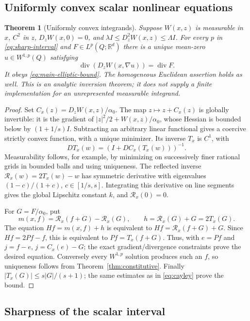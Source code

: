 \documentclass[11pt,a4paper]{article}
\numberwithin{equation}{section}
\newtheorem{theorem}{Theorem}[section]
\theoremstyle{definition}
\theoremstyle{remark}\newtheorem{remark}[theorem]{Remark}
\DeclareMathOperator{\diver}{div}
\newcommand{\R}{\mathbb R}
\newcommand{\Id}{I}
\begin{document}
\subsection{Uniformly convex scalar nonlinear equations}

\begin{theorem}[Uniformly convex integrands]\label{thm:nonlinear}
Suppose \(W(x,z)\) is measurable in \(x\), \(C^2\) in \(z\),
\(D_zW(x,0)=0\), and
\(\lambda\Id\leq D_z^2W(x,z)\leq\Lambda\Id\).
For every \(p\) in \eqref{eq:sharp-interval} and \(F\in L^p(Q;\R^d)\)
there is a unique mean-zero \(u\in W^{1,p}(Q)\) satisfying
\[
 \diver(D_zW(x,\nabla u))=\diver F.
\]
It obeys \eqref{eq:main-elliptic-bound}. The homogeneous Euclidean
assertion holds as well. This is an analytic inversion theorem;
it does not supply a finite implementation for an unrepresented
measurable integrand.
\end{theorem}

\begin{proof}
Set \(C_x(z)=D_zW(x,z)/\alpha_0\).
The map \(z\mapsto z+C_x(z)\) is globally invertible: it is the
gradient of \(|z|^2/2+W(x,z)/\alpha_0\), whose Hessian is bounded
below by \((1+1/s)\Id\). Subtracting an arbitrary linear functional
gives a coercive strictly convex function, with a unique minimizer.
Its inverse \(T_x\) is \(C^1\), with
\[
 D T_x(w)=(\Id+D C_x(T_x(w)))^{-1}.
\]
Measurability follows, for example, by minimizing on successively
finer rational grids in bounded balls and using uniqueness.
The reflected inverse
\(\mathcal R_x(w)=2T_x(w)-w\) has symmetric derivative with eigenvalues
\((1-c)/(1+c)\), \(c\in[1/s,s]\). Integrating this derivative on line
segments gives the global Lipschitz constant \(k\), and
\(\mathcal R_x(0)=0\).

For \(G=F/\alpha_0\), put
\[
 m(x,f)=\mathcal R_x(f+G)-\mathcal R_x(G),\qquad
 h=\mathcal R_x(G)+G=2T_x(G).
\]
The equation \(Hf=m(x,f)+h\) is equivalent to
\(Hf=\mathcal R_x(f+G)+G\).
Since \(Hf=2Pf-f\), this is equivalent to
\(Pf=T_x(f+G)\). Thus, with \(e=Pf\) and \(j=f-e\),
\(j=C_x(e)-G\); the exact gradient/divergence constraints prove the
desired equation. Conversely every \(W^{1,p}\) solution produces
such an \(f\), so uniqueness follows from Theorem~\ref{thm:constitutive}.
Finally \(|T_x(G)|\leq s|G|/(s+1)\); the same estimates as in
\eqref{eq:cayley} prove the bound.
\end{proof}

\subsection{Sharpness of the scalar interval}\label{subsec:elliptic-sharp}
\end{document}

